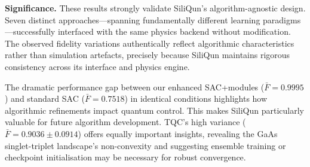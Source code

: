 \textbf{Significance.}
These results strongly validate SiliQun's algorithm-agnostic design. Seven distinct approaches—spanning fundamentally different learning paradigms—successfully interfaced with the same physics backend without modification. The observed fidelity variations authentically reflect algorithmic characteristics rather than simulation artefacts, precisely because SiliQun maintains rigorous consistency across its interface and physics engine.

The dramatic performance gap between our enhanced SAC+modules ($\bar{F} = 0.9995$) and standard SAC ($\bar{F} = 0.7518$) in identical conditions highlights how algorithmic refinements impact quantum control. This makes SiliQun particularly valuable for future algorithm development. TQC's high variance ($\bar{F} = 0.9036 \pm 0.0914$) offers equally important insights, revealing the GaAs singlet-triplet landscape's non-convexity and suggesting ensemble training or checkpoint initialisation may be necessary for robust convergence.
